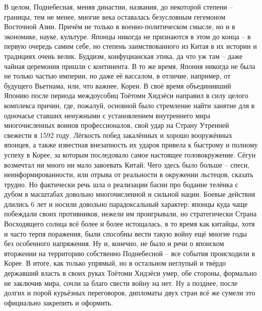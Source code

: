 В целом, Поднебесная, меняя династии, названия, до некоторой степени – границы, тем не менее, многие века оставалась безусловным гегемоном Восточной Азии. Причём не только в военно-политическом смысле, но и в экономике, науке, культуре. Японцы никогда не признаются в этом до конца – в первую очередь самим себе, но степень заимствованного из Китая в их истории и традициях очень велик. Буддизм, конфуцианская этика, да что уж там – даже чайная церемония пришли с континента. В то же время, Япония никогда не была не только частью империи, но даже её вассалом, в отличие, например, от будущего Вьетнама, или, что важнее, Кореи. В своё время объединивший Японию после периода междоусобиц Тоётоми Хидэёси направил в силу целого комплекса причин, где, пожалуй, основной было стремление найти занятие для в одночасье ставших ненужными с установлением внутреннего мира многочисленных воинов профессионалов, свой удар на Страну Утренней свежести в 1592 году. Лёгкость побед закалённых и хорошо вооружённых японцев, а также известная внезапность их ударов привела к быстрому и полному успеху в Корее, за которым последовало самое настоящее головокружение. Сёгун возмечтал ни много ни мало завоевать Китай. Чего здесь было больше – спеси, неинформированности, или отрыва от реальности в окружении льстецов, сказать трудно. Но фактически речь шла о реализации басни про бодание телёнка с дубом в масштабах довольно многочисленной и сильной нации. Боевые действия длились 6 лет и носили довольно парадоксальный характер: японцы куда чаще побеждали своих противников, нежели им проигрывали, но стратегически Страна Восходящего солнца всё более и более истощалась, в то время как китайцы, хотя и часто терпя поражения, были способны вести такую войну ещё многие годы без особенного напряжения. Ну и, конечно, не было и речи о японском вторжении на территорию собственно Поднебесной – все события происходили в Корее. В итоге, как только упрямый, но в остальном неглупый и твёрдо державший власть в своих руках Тоётоми Хидэёси умер, обе стороны, формально не заключив мира, сочли за благо свести войну на нет. Ну а позднее, после долгих и порой курьёзных переговоров, дипломаты двух стран всё же сумели это официально закрепить и оформить.

